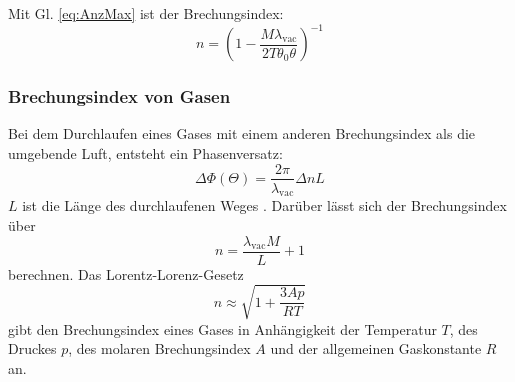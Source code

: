 Mit Gl. \eqref{eq:AnzMax} ist der Brechungsindex:
\begin{equation}
  n = \left(1 - \frac{M \lambda_{\text{vac}}}{2 T \theta_0 \theta}\right)^{-1} 
  \label{eq:n_glas}
\end{equation}

\subsubsection{Brechungsindex von Gasen}
Bei dem Durchlaufen eines Gases mit einem anderen Brechungsindex als die umgebende Luft,
entsteht ein Phasenversatz:
\begin{equation}
\Delta \Phi(\Theta)=\frac{2\pi}{\lambda_{\text{vac}}} \Delta n L
\label{eq:pM2}
\end{equation}
$L$ ist die Länge des durchlaufenen Weges \cite{V64}.
Darüber lässt sich der Brechungsindex über
\begin{equation}
  \label{eqn:n_luft}
  n = \frac{\lambda_{\text{vac}} M }{L} + 1
\end{equation}
\noindent berechnen.
\newline \newline
\noindent Das Lorentz-Lorenz-Gesetz
\begin{equation}
  n \approx \sqrt{1+ \frac{3Ap}{RT}}
  \label{eqn:lorentz}
\end{equation}
gibt den Brechungsindex eines Gases in Anhängigkeit der Temperatur $T$,
des Druckes $p$, des molaren Brechungsindex $A$ 
und der allgemeinen Gaskonstante $R$ an.
